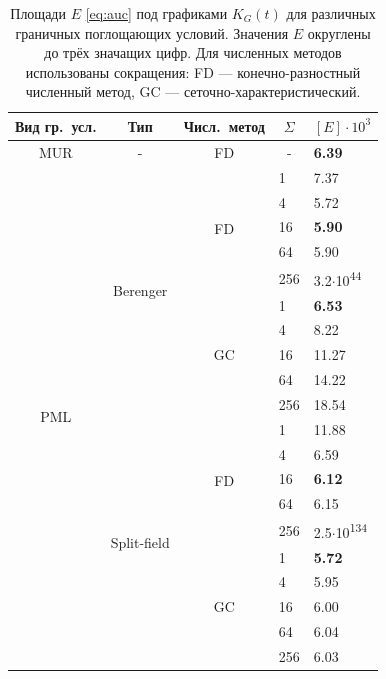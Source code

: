 \renewcommand{\arraystretch}{1.4}
\begin{table}[htb]
\centering
\begin{tabular}{|c|c|c|p{2.0cm}|p{2.0cm}|}
\hline
\textbf{Вид гр.~усл.} & \textbf{Тип} & \textbf{Числ.~метод} & \multicolumn{1}{c|}{$\Sigma$} & \multicolumn{1}{c|}{$\left[E\right] \cdot 10^3$} \\ \hline
MUR & - & FD & \multicolumn{1}{c|}{-} & \textbf{6.39} \\ \hline
\multirow{20}{*}{PML} & \multirow{10}{*}{Berenger} & \multirow{5}{*}{FD} & 1 & 7.37 \\ \cline{4-5} 
 &  &  & 4 & 5.72 \\ \cline{4-5} 
 &  &  & 16 & \textbf{5.90} \\ \cline{4-5} 
 &  &  & 64 & 5.90 \\ \cline{4-5} 
 &  &  & 256 & 3.2$\cdot$10\textsuperscript{44} \\ \cline{3-5} 
 &  & \multirow{5}{*}{GC} & 1 & \textbf{6.53} \\ \cline{4-5} 
 &  &  & 4 & 8.22 \\ \cline{4-5} 
 &  &  & 16 & 11.27 \\ \cline{4-5} 
 &  &  & 64 & 14.22 \\ \cline{4-5} 
 &  &  & 256 & 18.54 \\ \cline{2-5} 
 & \multirow{10}{*}{Split-field} & \multirow{5}{*}{FD} & 1 & 11.88 \\ \cline{4-5} 
 &  &  & 4 & 6.59 \\ \cline{4-5} 
 &  &  & 16 & \textbf{6.12} \\ \cline{4-5} 
 &  &  & 64 & 6.15 \\ \cline{4-5} 
 &  &  & 256 & 2.5$\cdot$10\textsuperscript{134} \\ \cline{3-5} 
 &  & \multirow{5}{*}{GC} & 1 & \textbf{5.72} \\ \cline{4-5} 
 &  &  & 4 & 5.95 \\ \cline{4-5} 
 &  &  & 16 & 6.00 \\ \cline{4-5} 
 &  &  & 64 & 6.04 \\ \cline{4-5} 
 &  &  & 256 & 6.03 \\ \hline
\end{tabular}
\caption{Площади $E$ \eqref{eq:auc} под графиками $K_G(t)$ для различных граничных поглощающих условий. Значения $E$ округлены до трёх значащих цифр. Для численных методов использованы сокращения: FD --- конечно-разностный численный метод, GC --- сеточно-характеристический.}
\label{tab:absorb_auc}
\end{table}
\renewcommand{\arraystretch}{1.0}